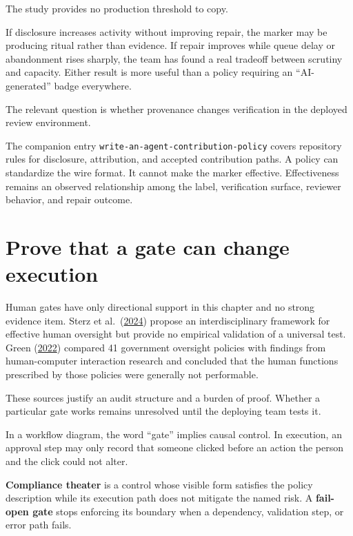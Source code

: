 The study provides no production threshold to copy.

If disclosure increases activity without improving repair, the marker may be producing ritual rather than evidence. If repair improves while queue delay or abandonment rises sharply, the team has found a real tradeoff between scrutiny and capacity. Either result is more useful than a policy requiring an ``AI-generated'' badge everywhere.

The relevant question is whether provenance changes verification in the deployed review environment.

The companion entry \texttt{write-an-agent-contribution-policy} covers repository rules for disclosure, attribution, and accepted contribution paths. A policy can standardize the wire format. It cannot make the marker effective. Effectiveness remains an observed relationship among the label, verification surface, reviewer behavior, and repair outcome.

\hypertarget{prove-that-a-gate-can-change-execution}{%
\section{Prove that a gate can change execution}\label{prove-that-a-gate-can-change-execution}}

Human gates have only directional support in this chapter and no strong evidence item. Sterz et al.~(\href{https://arxiv.org/abs/2404.04059}{2024}) propose an interdisciplinary framework for effective human oversight but provide no empirical validation of a universal test. Green (\href{https://arxiv.org/abs/2109.05067}{2022}) compared 41 government oversight policies with findings from human-computer interaction research and concluded that the human functions prescribed by those policies were generally not performable.

These sources justify an audit structure and a burden of proof. Whether a particular gate works remains unresolved until the deploying team tests it.

In a workflow diagram, the word ``gate'' implies causal control. In execution, an approval step may only record that someone clicked before an action the person and the click could not alter.

\textbf{Compliance theater} is a control whose visible form satisfies the policy description while its execution path does not mitigate the named risk. A \textbf{fail-open gate} stops enforcing its boundary when a dependency, validation step, or error path fails.

